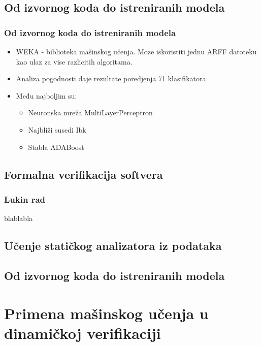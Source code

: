 \documentclass[11pt]{beamer}
\theoremstyle{definition}
\begin{document}
\subsection{Od izvornog koda do istreniranih modela}
\label{subsec:WEKA}
\begin{frame}
\frametitle{Od izvornog koda do istreniranih modela}
\begin{itemize}


\item WEKA - biblioteka mašinskog učenja.
Moze iskoristiti jednu ARFF datoteku kao ulaz za vise razlicitih algoritama.

\item Analiza pogodnosti daje rezultate poredjenja 71 klasifikatora.

\item Među najboljim su:
\begin{itemize}
	\item Neuronska mreža MultiLayerPerceptron
	\item Najbliži susedi Ibk
	\item Stabla ADABoost
\end{itemize}
\end{itemize}
\end{frame}



\subsection{Formalna verifikacija softvera}
\label{subsec:formalna-verifikacija}
\begin{frame}
\frametitle{Lukin rad}
blablabla
\end{frame}


\subsection{Učenje statičkog analizatora iz podataka}
\label{subsec:staticki-analizator}

\subsection{Od izvornog koda do istreniranih modela}
\label{subsec:pregled}

\section{Primena mašinskog učenja u dinamičkoj verifikaciji}
\label{sec:dinamcikaPrimena}
\end{document}
